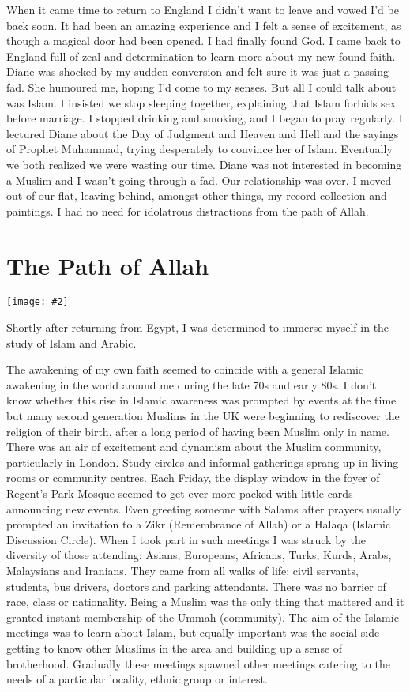 \documentclass[12pt]{memoir}
\newcommand{\cor}[2]{#2} %
\newcommand{\img}[3]{\begin{center}%
\texttt{[image: \#2]}\\{\small\em#3}%
\end{center}}
\begin{document}
When it came time to return to England I didn’t want to leave
and vowed I’d be back soon.
It had been an amazing experience and I felt a sense of excitement,
as though a magical door had been opened.
I had finally found God.
I came back to England full of zeal and determination
to learn more about my new-found faith.
Diane was shocked by my sudden conversion
and felt sure it was just a passing fad.
She humoured me, hoping I’d come to my senses.
But all I could talk about was Islam.
I insisted we stop sleeping together,
explaining that Islam forbids sex before marriage.
I stopped drinking and smoking, and I began to pray regularly.
I lectured Diane about the Day of Judgment and Heaven and Hell
and the sayings of Prophet Muhammad,
trying desperately to convince her of Islam.
Eventually we both realized we were wasting our time.
Diane was not interested in becoming a Muslim
and I wasn’t going through a fad.
Our relationship was over.
I moved out of our flat, leaving behind, amongst other things,
my record collection and paintings.
I had no need for idolatrous distractions from the path of Allah.


\chapter{The Path of Allah}

\img{scale=1}{Hassan_1980.jpg}{}

Shortly after returning from Egypt,
I was determined to immerse myself in the study of Islam and Arabic.

The awakening of my own faith seemed to coincide
with a general Islamic awakening in the world around me
during the late 70s and early 80s.
I don’t know whether this rise in Islamic awareness was prompted by events
at the time but many second generation Muslims in the UK
were beginning to \cor{re-discover}{rediscover} the religion of their birth,
after a long period of having been Muslim only in name.
There was an air of excitement and dynamism about the Muslim community,
particularly in London.
Study circles and informal gatherings sprang up
in living rooms or community centres.
Each Friday, the display window in the foyer of Regent’s Park Mosque
seemed to get ever more packed with little cards announcing new events.
Even greeting someone with Salams after prayers usually prompted an invitation
to a Zikr (Remembrance of Allah) or a Halaqa (Islamic Discussion Circle).
When I took part in such meetings
I was struck by the diversity of those attending:
Asians, Europeans, Africans, Turks, Kurds, Arabs, Malaysians and Iranians.
They came from all walks of life: civil servants, students, bus drivers,
doctors and parking attendants.
There was no barrier of race, class or nationality.
Being a Muslim was the only thing that mattered
and it granted instant membership of the Ummah (community).
The aim of the Islamic meetings was to learn about Islam,
but equally important was the social side —
getting to know other Muslims in the area
and building up a sense of brotherhood.
Gradually these meetings spawned other meetings
catering to the needs of a particular locality, ethnic group or interest.
\end{document}
